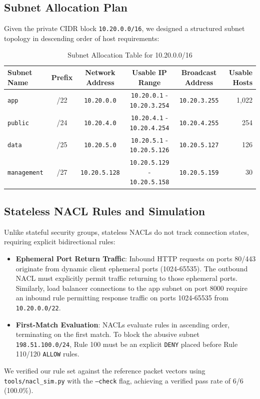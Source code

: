 \documentclass[10pt,a4paper]{article}
\begin{document}
\subsection{Subnet Allocation Plan}
Given the private CIDR block \texttt{10.20.0.0/16}, we designed a structured subnet topology in descending order of host requirements:
\begin{table}[h]
\centering
\small
\caption{Subnet Allocation Table for 10.20.0.0/16}
\label{tab:subnets}
\setlength{\tabcolsep}{4.5pt}
\begin{tabular}{|l|c|c|c|c|r|}
\hline
\textbf{Subnet Name} & \textbf{Prefix} & \textbf{Network Address} & \textbf{Usable IP Range} & \textbf{Broadcast Address} & \textbf{Usable Hosts} \\
\hline
\texttt{app} & /22 & \texttt{10.20.0.0} & \texttt{10.20.0.1} - \texttt{10.20.3.254} & \texttt{10.20.3.255} & 1,022 \\
\hline
\texttt{public} & /24 & \texttt{10.20.4.0} & \texttt{10.20.4.1} - \texttt{10.20.4.254} & \texttt{10.20.4.255} & 254 \\
\hline
\texttt{data} & /25 & \texttt{10.20.5.0} & \texttt{10.20.5.1} - \texttt{10.20.5.126} & \texttt{10.20.5.127} & 126 \\
\hline
\texttt{management} & /27 & \texttt{10.20.5.128} & \texttt{10.20.5.129} - \texttt{10.20.5.158} & \texttt{10.20.5.159} & 30 \\
\hline
\end{tabular}
\end{table}

\subsection{Stateless NACL Rules and Simulation}
Unlike stateful security groups, stateless NACLs do not track connection states, requiring explicit bidirectional rules:
\begin{itemize}
    \item \textbf{Ephemeral Port Return Traffic}: Inbound HTTP requests on ports 80/443 originate from dynamic client ephemeral ports (1024-65535). The outbound NACL must explicitly permit traffic returning to those ephemeral ports. Similarly, load balancer connections to the app subnet on port 8000 require an inbound rule permitting response traffic on ports 1024-65535 from \texttt{10.20.0.0/22}.
    \item \textbf{First-Match Evaluation}: NACLs evaluate rules in ascending order, terminating on the first match. To block the abusive subnet \texttt{198.51.100.0/24}, Rule 100 must be an explicit \texttt{DENY} placed before Rule 110/120 \texttt{ALLOW} rules.
\end{itemize}
We verified our rule set against the reference packet vectors using \texttt{tools/nacl\_sim.py} with the \texttt{--check} flag, achieving a verified pass rate of 6/6 (100.0\%).
\end{document}
